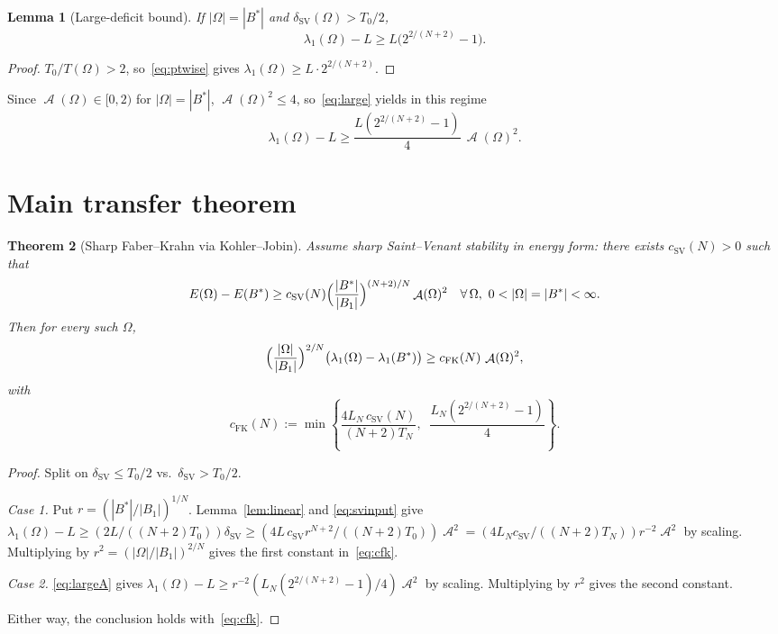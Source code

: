 \documentclass[11pt]{article}
\newtheorem{theorem}{Theorem}
\newtheorem{lemma}[theorem]{Lemma}
\theoremstyle{definition}
\DeclareMathOperator{\Asym}{\mathcal{A}}
\begin{document}
\begin{lemma}[Large-deficit bound]\label{lem:large}
If $|\Omega|=|B^*|$ and $\delta_{\mathrm{SV}}(\Omega)>T_0/2$,
\begin{equation}\label{eq:large}
\lambda_1(\Omega)-L\ge L\bigl(2^{2/(N+2)}-1\bigr).
\end{equation}
\end{lemma}

\begin{proof}
$T_0/T(\Omega)>2$, so~\eqref{eq:ptwise} gives
$\lambda_1(\Omega)\ge L\cdot 2^{2/(N+2)}$.
\end{proof}

Since $\Asym(\Omega)\in[0,2)$ for $|\Omega|=|B^*|$,
$\Asym(\Omega)^2\le4$, so~\eqref{eq:large} yields in this regime
\begin{equation}\label{eq:largeA}
\lambda_1(\Omega)-L\ge\frac{L(2^{2/(N+2)}-1)}{4}\,\Asym(\Omega)^2.
\end{equation}

\section{Main transfer theorem}\label{sec:main}

\begin{theorem}[Sharp Faber--Krahn via Kohler--Jobin]\label{thm:main}
Assume sharp Saint--Venant stability in energy form: there exists
$c_{\mathrm{SV}}(N)>0$
such that
\begin{equation}\label{eq:svinput}
E(\Omega)-E(B^*)\ge c_{\mathrm{SV}}(N)
\Bigl(\frac{|B^*|}{|B_1|}\Bigr)^{(N+2)/N}\Asym(\Omega)^2
\quad\forall\,\Omega,\ 0<|\Omega|=|B^*|<\infty.
\end{equation}
Then for every such $\Omega$,
\begin{equation}\label{eq:fkout}
\Bigl(\frac{|\Omega|}{|B_1|}\Bigr)^{2/N}
\bigl(\lambda_1(\Omega)-\lambda_1(B^*)\bigr)
\ge c_{\mathrm{FK}}(N)\,\Asym(\Omega)^2,
\end{equation}
with
\begin{equation}\label{eq:cfk}
c_{\mathrm{FK}}(N):=\min\!\left\{
\frac{4L_N\,c_{\mathrm{SV}}(N)}{(N+2)T_N},\;\;
\frac{L_N(2^{2/(N+2)}-1)}{4}
\right\}.
\end{equation}
\end{theorem}

\begin{proof}
Split on $\delta_{\mathrm{SV}}\le T_0/2$ vs.\ $\delta_{\mathrm{SV}}>T_0/2$.

\emph{Case 1.} Put $r=(|B^*|/|B_1|)^{1/N}$. Lemma~\ref{lem:linear} and
\eqref{eq:svinput} give
$\lambda_1(\Omega)-L\ge(2L/((N+2)T_0))\delta_{\mathrm{SV}}
\ge(4L\,c_{\mathrm{SV}}r^{N+2}/((N+2)T_0))\Asym^2
=(4L_N c_{\mathrm{SV}}/((N+2)T_N))r^{-2}\Asym^2$ by scaling. Multiplying
by $r^2=(|\Omega|/|B_1|)^{2/N}$ gives the first constant in~\eqref{eq:cfk}.

\emph{Case 2.} \eqref{eq:largeA} gives
$\lambda_1(\Omega)-L\ge r^{-2}(L_N(2^{2/(N+2)}-1)/4)\Asym^2$ by scaling.
Multiplying by $r^2$ gives the second constant.

Either way, the conclusion holds with~\eqref{eq:cfk}.
\end{proof}
\end{document}
